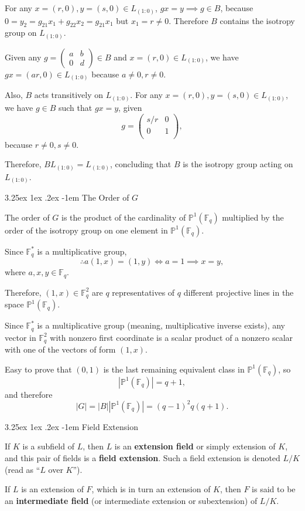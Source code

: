 \documentclass[12pt, letterpaper]{article}
\makeatletter
\newcommand{\field}{\mathbb{F}}
\newcommand{\card}[1]{\left\lvert #1 \right\rvert}
\renewcommand\paragraph{\@startsection{paragraph}{4}{\z@}%
	{3.25ex \@plus1ex \@minus.2ex}%
	{-1em}%
	{\normalfont\normalsize\bfseries}}
\theoremstyle{definition}
\theoremstyle{remark}
\theoremstyle{definition}
\theoremstyle{plain}
\numberwithin{equation}{section}
\makeatother
\begin{document}
	For any $x=(r,0),y=(s,0)\in L_{(1:0)}$,
	$gx=y\implies g\in B$, because $0=y_2=g_{21}x_1+g_{22}x_2=g_{21}x_1$
	but $x_1=r\ne0$. Therefore $B$ contains the isotropy group on $L_{(1:0)}$.
	
	Given any $g=\begin{pmatrix}
		a&b\\0&d
	\end{pmatrix}\in B$ and $x=(r,0)\in L_{(1:0)}$,
	we have $gx=(ar,0)\in L_{(1:0)}$ because $a\ne0,r\ne0$.
	
	Also, $B$ acts transitively on $L_{(1:0)}$. For any $x=(r,0),y=(s,0)\in L_{(1:0)}$,
	we have $g\in B$
	such that
	$gx=y$,
	given 
	\[g = \begin{pmatrix}
		s/r&0\\
		0&1\\
	\end{pmatrix}, \]
	because $r\ne0,s\ne0$.
		
	Therefore, $BL_{(1:0)}=L_{(1:0)}$, concluding that $B$ is the isotropy group acting on $L_{(1:0)}$.
	
	\paragraph{The Order of $G$}
	
	The order of $G$ is the product of the cardinality of $\mathbb{P}^1(\field_q)$
	multiplied by the order of the isotropy group on one element in $\mathbb{P}^1(\field_q)$.
	
	Since $\field_q^*$ is a multiplicative group,
	\[\therefore a(1,x)=(1,y)\iff a=1\implies x=y,\]
	where $a,x,y\in\field_q$.
	
	Therefore, $(1,x)\in \field_q^2$ are $q$ representatives of $q$ different projective lines
	in the space $\mathbb{P}^1(\field_q)$.
	
	Since $\field_q^*$ is a multiplicative group (meaning, multiplicative inverse exists),
	any vector in $\field_q^2$ with nonzero first coordinate
	is a scalar product of a nonzero scalar with one of the vectors of form $(1,x)$.
	
	Easy to prove that $(0,1)$ is the last remaining equivalent class in $\mathbb{P}^1(\field_q)$, so
	\[\card{\mathbb{P} ^1(\field_q)}=q+1, \]
	and therefore
	\[ \card{G} = \card{B}\card{\mathbb{P} ^1(\field_q)}=(q-1)^2q(q+1). \]
	
	\paragraph{Field Extension}
	\begin{def*}
		If $K$ is a subfield of $L$,
		then $L$ is an \textbf{extension field} or simply extension of $K$,
		and this pair of fields is a \textbf{field extension}.
		Such a field extension is denoted $L / K$ (read as ``$L$ over $K$'').
	\end{def*}
	\begin{def*}
		If $L$ is an extension of $F$, which is in turn an extension of $K$,
		then $F$ is said to be an \textbf{intermediate field} (or intermediate extension or subextension) of $L / K$.
	\end{def*}
	
\end{document}
